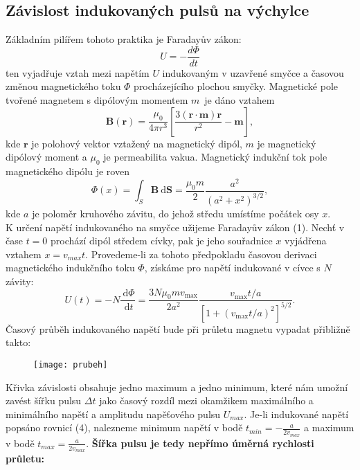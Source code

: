 \documentclass[czech,11pt,a4paper]{article}
\begin{document}
	\subsection{Závislost indukovaných pulsů na výchylce}
	Základním pilířem tohoto praktika je Faradayův zákon:
	\begin{equation}
		U = - \frac{d \Phi}{dt}
	\end{equation}
	ten vyjadřuje vztah mezi napětím $U$ indukovaným v uzavřené smyčce a časovou změnou magnetického toku $\Phi$ procházejícího plochou smyčky.
	Magnetické pole tvořené magnetem s dipólovým momentem $m$~je dáno vztahem
	\begin{equation}
		\boldsymbol{B}(\boldsymbol{r})=\frac{\mu_0}{4 \pi r^3}\left[\frac{3(\boldsymbol{r} \cdot \boldsymbol{m}) \boldsymbol{r}}{r^2}-\boldsymbol{m}\right],
	\end{equation}
	kde $\boldsymbol{r}$ je polohový vektor vztažený na magnetický dipól, $m$ je magnetický dipólový moment a $\mu_0$ je permeabilita vakua. Magnetický indukční tok pole magnetického dipólu je roven
	\begin{equation}
		\Phi(x)=\int_S \boldsymbol{B} \mathrm{~d} \boldsymbol{S}=\frac{\mu_0 m}{2} \frac{a^2}{\left(a^2+x^2\right)^{3 / 2}},
	\end{equation}
	kde $ a$ je poloměr kruhového závitu, do jehož středu umístíme počátek osy $x$. \\
	K určení napětí indukovaného na smyčce užijeme Faradayův zákon (1). Nechť v čase $t = 0$ prochází dipól středem cívky, pak je jeho souřadnice $x$ vyjádřena vztahem $x = v_{max}t$. Provedeme-li za tohoto předpokladu časovou derivaci magnetického indukčního toku $\Phi$, získáme pro napětí indukované v cívce s $N$ závity:
	\begin{equation}
		U(t)=-N \frac{\mathrm{~d} \Phi}{\mathrm{~d} t}=\frac{3 N \mu_0 m v_{\max }}{2 a^2} \frac{v_{\max } t / a}{\left[1+\left(v_{\max } t / a\right)^2\right]^{5 / 2}}.
	\end{equation}
	Časový průběh indukovaného napětí bude při průletu magnetu vypadat přibližně takto:
		\begin{figure}[h]
	\begin{center}
			\texttt{[image: prubeh]}
	\end{center}
	\end{figure}
	Křivka závislosti obsahuje jedno maximum a jedno minimum, které nám umožní zavést šířku pulsu $\Delta t$ jako časový rozdíl mezi okamžikem maximálního a minimálního napětí a amplitudu napěťového pulsu $U_{max}$. Je-li indukované napětí popsáno rovnicí (4), nalezneme minimum napětí v bodě $t_{min} = - \frac{a}{2v_{max}}$ a maximum v bodě  $t_{max} =  \frac{a}{2v_{max}}$. \textbf{Šířka pulsu je tedy nepřímo úměrná rychlosti průletu:}
\end{document}
